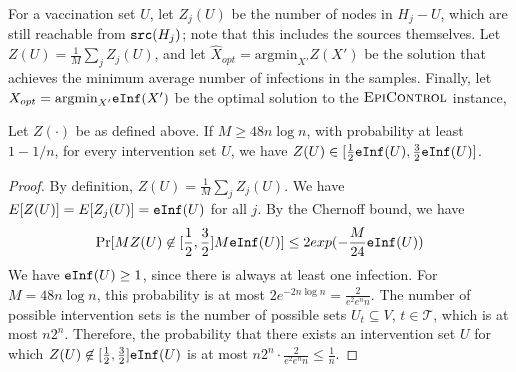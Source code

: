 For a vaccination set $U$, let $Z_j(U)$ be the number of nodes in 
$H_j-U$, which are still reachable from $\texttt{src}(H_j)$;
note that this includes the sources themselves.
Let $Z(U)=\frac{1}{M}\sum_j Z_j(U)$, and let $\hat{X}_{opt}=\mbox{argmin}_{X'}Z(X')$ be the solution that
achieves the minimum average number of infections in the samples.
Finally, let $X_{opt}=\mbox{argmin}_{X'}\texttt{eInf}(X')$ be the optimal solution to the $\textsc{EpiControl}{}$ instance,

\begin{lemma}
\label{lemma:conc}
Let $Z(\cdot)$ be as defined above. If $M\geq 48n\log{n}$, with probability at least $1-1/n$, for every intervention set $U$,
we have $Z(U)\in [\frac{1}{2}\texttt{eInf}(U), \frac{3}{2}\texttt{eInf}(U)]$.
\end{lemma}
\begin{proof}
By definition, $Z(U)=\frac{1}{M}\sum_j Z_j(U)$.
We have $E[Z(U)] = E[Z_j(U)]=\texttt{eInf}(U)$ for all $j$.
By the Chernoff bound, we have
\[
\Pr[MZ(U)\not\in [\frac{1}{2}, \frac{3}{2}]M\texttt{eInf}(U)]\leq 2exp(-\frac{M}{24}\texttt{eInf}(U))
\]
We have $\texttt{eInf}(U)\geq 1$, since there is always at least one infection.
For $M=48n\log{n}$, this probability is at most $2e^{-2n\log{n}} = \frac{2}{e^2e^nn}$.
The number of possible intervention sets is the number of possible sets $U_t\subseteq V$, $t\in\mathcal{T}$,
which is at most $n2^n$.
Therefore, the probability that there exists an intervention set $U$ for which
$Z(U)\not\in [\frac{1}{2}, \frac{3}{2}]\texttt{eInf}(U)$ is at most $n2^n\cdot \frac{2}{e^2e^nn}\leq \frac{1}{n}$.
\end{proof}

